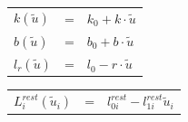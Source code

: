 \documentclass[pdftex,a4paper,11pt]{article}
\numberwithin{equation}{subsection}
\begin{document}
\paragraph{}
\begin{tabular}{lcl}
    $k(\tilde{u})$    & = & $k_0 + k \cdot \tilde{u}$ \\
    $b(\tilde{u})$    & = & $b_0 + b \cdot \tilde{u}$ \\
    $l_r(\tilde{u})$  & = & $l_0 - r \cdot \tilde{u}$ \\
\end{tabular}

\begin{tabular}{lcl}
    $L_i^{rest}(\tilde{u}_i)$ & = & $l_{0i}^{rest} - l_{1i}^{rest} \tilde{u}_i$ \\
\end{tabular}
\end{document}
